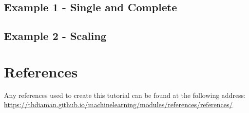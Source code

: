 \documentclass[10pt,twoside,a4paper,openany]{memoir}
\renewcommand*{\printchaptertitle}[1]{\vspace{-2.5cm}\chaptitlefont\thechapter.\ ##1\vspace{-1cm}}
\begin{document}
\section{Example 1 - Single and Complete}


\newpage
\section{Example 2 - Scaling}



\backmatter

\renewcommand*{\printchaptertitle}[1]{\chaptitlefont#1}
\chapter*{References}
Any references used to create this tutorial can be found at the following address:\\
\href{https://thdiaman.github.io/machinelearning/modules/references/references/}{https://thdiaman.github.io/machinelearning/modules/references/references/}
\end{document}
